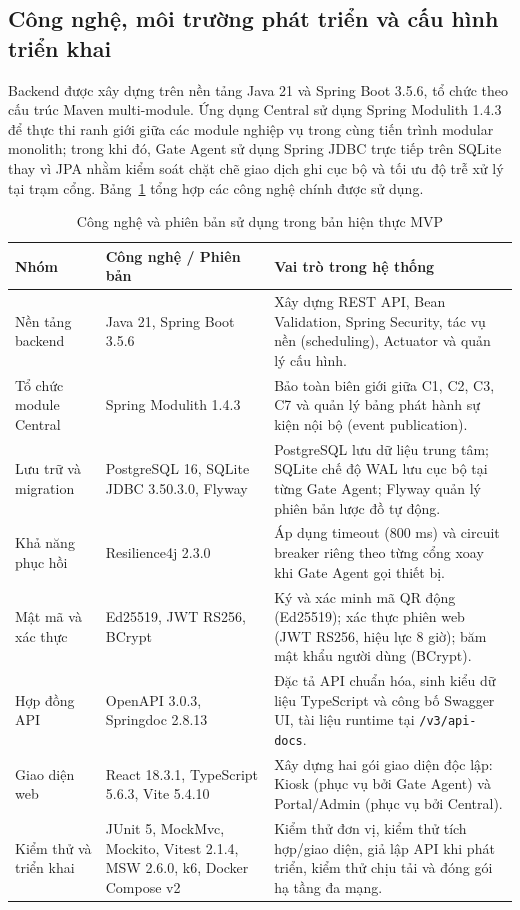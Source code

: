 \subsection{Công nghệ, môi trường phát triển và cấu hình triển khai}\label{sec:implementation-technology}

Backend được xây dựng trên nền tảng Java 21 và Spring Boot 3.5.6, tổ chức theo cấu trúc Maven
multi-module. Ứng dụng Central sử dụng Spring Modulith 1.4.3 để thực thi ranh giới giữa các module
nghiệp vụ trong cùng tiến trình modular monolith; trong khi đó, Gate Agent sử dụng Spring JDBC trực
tiếp trên SQLite thay vì JPA nhằm kiểm soát chặt chẽ giao dịch ghi cục bộ và tối ưu độ trễ xử lý tại
trạm cổng. Bảng~\ref{tab:implementation-technology-stack} tổng hợp các công nghệ chính được sử dụng.

\begin{table}[H]
\centering
\caption{Công nghệ và phiên bản sử dụng trong bản hiện thực MVP}
\label{tab:implementation-technology-stack}
\small
\renewcommand{\arraystretch}{1.25}
\begin{tabularx}{\textwidth}{|>{\raggedright\arraybackslash}p{3.2cm}|>{\raggedright\arraybackslash}p{3.6cm}|>{\raggedright\arraybackslash}X|}
\hline
\textbf{Nhóm} & \textbf{Công nghệ / Phiên bản} & \textbf{Vai trò trong hệ thống} \\
\hline
Nền tảng backend & Java 21, Spring Boot 3.5.6 & Xây dựng REST API, Bean Validation, Spring Security, tác vụ nền (scheduling), Actuator và quản lý cấu hình. \\
\hline
Tổ chức module Central & Spring Modulith 1.4.3 & Bảo toàn biên giới giữa C1, C2, C3, C7 và quản lý bảng phát hành sự kiện nội bộ (event publication). \\
\hline
Lưu trữ và migration & PostgreSQL 16, SQLite JDBC 3.50.3.0, Flyway & PostgreSQL lưu dữ liệu trung tâm; SQLite chế độ WAL lưu cục bộ tại từng Gate Agent; Flyway quản lý phiên bản lược đồ tự động. \\
\hline
Khả năng phục hồi & Resilience4j 2.3.0 & Áp dụng timeout (800 ms) và circuit breaker riêng theo từng cổng xoay khi Gate Agent gọi thiết bị. \\
\hline
Mật mã và xác thực & Ed25519, JWT RS256, BCrypt & Ký và xác minh mã QR động (Ed25519); xác thực phiên web (JWT RS256, hiệu lực 8 giờ); băm mật khẩu người dùng (BCrypt). \\
\hline
Hợp đồng API & OpenAPI 3.0.3, Springdoc 2.8.13 & Đặc tả API chuẩn hóa, sinh kiểu dữ liệu TypeScript và công bố Swagger UI, tài liệu runtime tại \texttt{/v3/api-docs}. \\
\hline
Giao diện web & React 18.3.1, TypeScript 5.6.3, Vite 5.4.10 & Xây dựng hai gói giao diện độc lập: Kiosk (phục vụ bởi Gate Agent) và Portal/Admin (phục vụ bởi Central). \\
\hline
Kiểm thử và triển khai & JUnit 5, MockMvc, Mockito, Vitest 2.1.4, MSW 2.6.0, k6, Docker Compose v2 & Kiểm thử đơn vị, kiểm thử tích hợp/giao diện, giả lập API khi phát triển, kiểm thử chịu tải và đóng gói hạ tầng đa mạng. \\
\hline
\end{tabularx}
\end{table}

